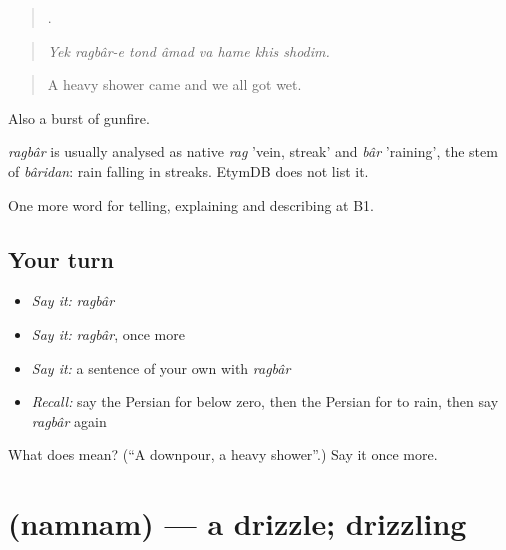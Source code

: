\begin{quote}
       .
\end{quote}

\begin{quote}
\emph{Yek ragbâr-e tond âmad va hame khis shodim.}
\end{quote}

\begin{quote}
A heavy shower came and we all got wet.
\end{quote}

Also a burst of gunfire.

\begin{cousinweb}
\emph{ragbâr} is usually analysed as native \emph{rag} 'vein, streak' and \emph{bâr} 'raining', the stem of \emph{bâridan}: rain falling in streaks. EtymDB does not list it.
\end{cousinweb}

\begin{grammarlens}[title={What you've built}]
One more word for telling, explaining and describing at B1.
\end{grammarlens}

\subsection*{Your turn}
\begin{itemize}
\raggedright
  \item \emph{Say it:} \emph{ragbâr}
  \item \emph{Say it:} \emph{ragbâr}, once more
  \item \emph{Say it:} a sentence of your own with \emph{ragbâr}
  \item \emph{Recall:} say the Persian for below zero, then the Persian for to rain, then say \emph{ragbâr} again
\end{itemize}

\begin{tcolorbox}[breakable,colback=teal!4,colframe=teal!35!black,title={Before you move on}]
What does  mean? (\textquotedblleft{}A downpour, a heavy shower\textquotedblright{}.) Say it once more.
\end{tcolorbox}
\section[\texorpdfstring{\fa{نم} \fa{نم} (namnam)}{نم نم (namnam)}]{  (namnam) — a drizzle; drizzling}

